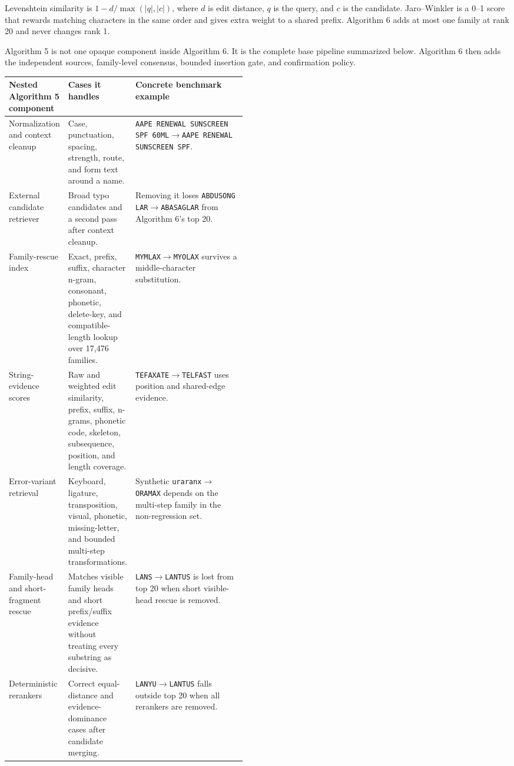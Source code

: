 \documentclass[11pt]{article}
\newcommand{\code}[1]{\texttt{#1}}
\begin{document}
Levenshtein similarity is $1-d/\max(|q|,|c|)$, where $d$ is edit distance,
$q$ is the query, and $c$ is the candidate. Jaro--Winkler is a 0--1 score that
rewards matching characters in the same order and gives extra weight to a
shared prefix. Algorithm 6 adds at most one family at rank 20 and never changes
rank 1.

Algorithm 5 is not one opaque component inside Algorithm 6. It is the complete
base pipeline summarized below. Algorithm 6 then adds the independent sources,
family-level consensus, bounded insertion gate, and confirmation policy.

\begin{table}[htbp]
\centering
\small
\begin{tabularx}{\linewidth}{@{}L{0.20\linewidth}L{0.27\linewidth}Y@{}}
\toprule
\textbf{Nested Algorithm 5 component} & \textbf{Cases it handles} & \textbf{Concrete benchmark example} \\
\midrule
Normalization and context cleanup & Case, punctuation, spacing, strength, route, and form text around a name. & \code{AAPE RENEWAL SUNSCREEN SPF 60ML}$\rightarrow$\code{AAPE RENEWAL SUNSCREEN SPF}. \\
External candidate retriever & Broad typo candidates and a second pass after context cleanup. & Removing it loses \code{ABDUSONG LAR}$\rightarrow$\code{ABASAGLAR} from Algorithm 6's top 20. \\
Family-rescue index & Exact, prefix, suffix, character n-gram, consonant, phonetic, delete-key, and compatible-length lookup over 17,476 families. & \code{MYMLAX}$\rightarrow$\code{MYOLAX} survives a middle-character substitution. \\
String-evidence scores & Raw and weighted edit similarity, prefix, suffix, n-grams, phonetic code, skeleton, subsequence, position, and length coverage. & \code{TEFAXATE}$\rightarrow$\code{TELFAST} uses position and shared-edge evidence. \\
Error-variant retrieval & Keyboard, ligature, transposition, visual, phonetic, missing-letter, and bounded multi-step transformations. & Synthetic \code{uraranx}$\rightarrow$\code{ORAMAX} depends on the multi-step family in the non-regression set. \\
Family-head and short-fragment rescue & Matches visible family heads and short prefix/suffix evidence without treating every substring as decisive. & \code{LANS}$\rightarrow$\code{LANTUS} is lost from top 20 when short visible-head rescue is removed. \\
Deterministic rerankers & Correct equal-distance and evidence-dominance cases after candidate merging. & \code{LANYU}$\rightarrow$\code{LANTUS} falls outside top 20 when all rerankers are removed. \\

\end{tabularx}
\end{table}
\end{document}
